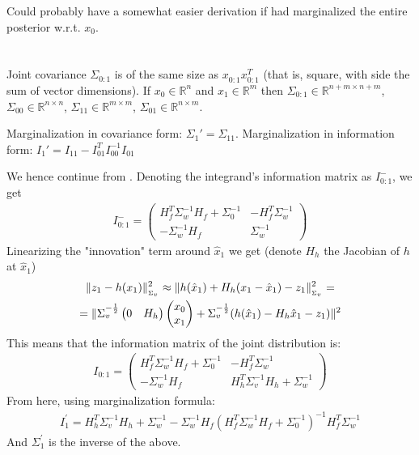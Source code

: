 \documentclass[a4paper]{scrreprt}
\begin{document}
Could probably have a somewhat easier derivation if had marginalized the entire 
posterior w.r.t. $x_0$. 

\section{}
Joint covariance $\Sigma_{0:1}$ is of the same size as $x_{0:1}^{ } x_{0:1}^T$ 
(that is, square, 
with side the sum of vector dimensions). If $x_0\in \mathbb{R}^n$ and $x_1\in 
\mathbb{R}^m$ then $\Sigma_{0:1}\in \mathbb{R}^{n+m\times n+m}$, 
$\Sigma_{00}\in\mathbb{R}^{n\times n}$, $\Sigma_{11}\in\mathbb{R}^{m\times m}$, 
$\Sigma_{01}\in\mathbb{R}^{n\times m}$. 

Marginalization in covariance form: $\Sigma_1' = \Sigma_{11}$.  Marginalization 
in information form: $I_1' = I_{11} - I_{01}^TI_{00}^{-1}I_{01}$

We hence continue from . Denoting the integrand's 
information matrix as $I_{0:1}^-$, we get 
\begin{gather}
	I_{0:1}^- = 
	\begin{pmatrix}
	H_f^T\Sigma_w^{-1}H_f + \Sigma_0^{-1} & -H_f^T\Sigma_w^{-1} \\
	-\Sigma_w^{-1}H_f & \Sigma_w^{-1}
	\end{pmatrix}
\end{gather}
Linearizing the "innovation" term around $\hat{x}_1$ we get (denote $H_h$ the 
Jacobian of $h$ at $\hat{x}_1$)
\begin{gather}
	\nrmsq{_{\Sigma_v}}{z_1-h(x_1)} \approx
	\nrmsq{_{\Sigma_v}}{h(\hat{x}_1) + H_h (x_1-\hat{x}_1) - z_1} =
	\\
	= \nrmsq{}{
	\Sigma_v^{-\frac{1}{2}}\begin{pmatrix}
	0 & H_h
	\end{pmatrix}
	\begin{pmatrix}
	x_0 \\ x_1
	\end{pmatrix}
	+ \Sigma_v^{-\frac{1}{2}}(h(\hat{x}_1) - H_h \hat{x}_1 - z_1)}
\end{gather}
This means that the information matrix of the joint distribution is: 
\begin{gather}
	I_{0:1} = 	
	\begin{pmatrix}
		H_f^T\Sigma_w^{-1}H_f + \Sigma_0^{-1} & -H_f^T\Sigma_w^{-1} \\
		-\Sigma_w^{-1}H_f & H_h^T\Sigma_v^{-1}H_h + \Sigma_w^{-1}
		\end{pmatrix}
\end{gather}
From here, using marginalization formula: 
\begin{gather}
	I_1^\prime = 
	H_h^T\Sigma_v^{-1}H_h + \Sigma_w^{-1} - 
	\Sigma_w^{-1}H_f\left(H_f^T\Sigma_w^{-1}H_f + \Sigma_0^{-1}\right)^{-1}
	H_f^T\Sigma_w^{-1}
\end{gather}
And $\Sigma_1^\prime$ is the inverse of the above. 
\end{document}
